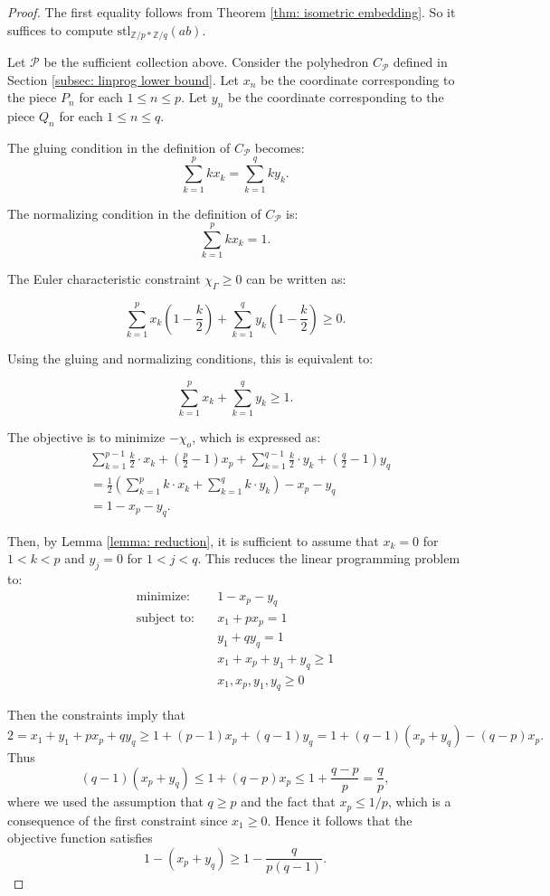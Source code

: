 \documentclass{amsart}
\theoremstyle{definition}
\numberwithin{equation}{section}
\theoremstyle{theorem}
\theoremstyle{remark}
\def\Z{\mathbb Z}
\def\stl{\mathrm{stl}}
\begin{document}
	\begin{proof}
		The first equality follows from Theorem \ref{thm: isometric embedding}. So it suffices to compute $\stl_{\Z/p*\Z/q}(ab)$.
		
		Let $\mathcal{P}$ be the sufficient collection above. Consider the polyhedron $C_{\mathcal{P}}$ defined in Section \ref{subsec: linprog lower bound}. Let $x_n$ be the coordinate corresponding to the piece $P_n$ for each $1\leq n \leq p$. Let $y_n$ be the coordinate corresponding to the piece $Q_n$ for each $1 \leq n \leq q$. 
		
		The gluing condition in the definition of $C_\mathcal{P}$ becomes:
		$$\sum_{k=1}^p kx_k = \sum_{k=1}^q ky_k.
		$$
		
		The normalizing condition in the definition of $C_{\mathcal{P}}$ is: 
		$$\sum_{k=1}^p kx_k=1.
		$$
		
		The Euler characteristic constraint $\chi_\Gamma \geq 0$ can be written as: 
		
		$$ \sum_{k=1}^{p} x_k \left(1-\frac{k}{2}\right) + \sum_{k=1}^q y_k \left(1-\frac{k}{2}\right) \geq 0.
		$$
		
		Using the gluing and normalizing conditions, this is equivalent to: 
		
		$$\sum_{k=1}^p x_k + \sum_{k=1}^q y_k \geq 1.
		$$
		
		The objective is to minimize $-\chi_o$, which is expressed as: 
		\begin{align*}
			& \sum_{k=1}^{p-1}\frac{k}{2}\cdot x_k + \left(\frac{p}{2}-1\right)x_p + \sum_{k=1}^{q-1}\frac{k}{2}\cdot y_k + \left(\frac{q}{2}-1\right)y_q\\
			& = \frac{1}{2}\left(\sum_{k=1}^p k\cdot x_k +\sum_{k=1}^q k \cdot y_k \right) -x_p-y_q\\
			& = 1-x_p -y_q.
		\end{align*}
		
		Then, by Lemma \ref{lemma: reduction}, it is sufficient to assume that $x_k=0$ for $1<k<p$ and $y_j=0$ for $1<j<q$. This reduces the linear programming problem to: 
		\begin{align*}
			\text{minimize:}\quad     &1-x_p-y_q\\
			\text{subject to:}\quad &x_1+px_p=1\\
			&y_1+qy_q=1\\
			&x_1+x_p+y_1+y_q\geq 1\\
			& x_1, x_p, y_1, y_q \geq 0
		\end{align*}
		
		Then the constraints imply that
		$$2=x_1+y_1+px_p+qy_q\ge 1+(p-1)x_p+(q-1)y_q=1+(q-1)(x_p+y_q)-(q-p)x_p.$$
		Thus 
		$$(q-1)(x_p+y_q)\le 1+(q-p)x_p\le 1+\frac{q-p}{p}=\frac{q}{p},$$
		where we used the assumption that $q\ge p$ and the fact that $x_p\le 1/p$, which is a consequence of the first constraint since $x_1\ge0$.
		Hence it follows that the objective function satisfies
		$$1-(x_p+y_q)\ge 1-\frac{q}{p(q-1)}.$$
		

\end{proof}
\end{document}
